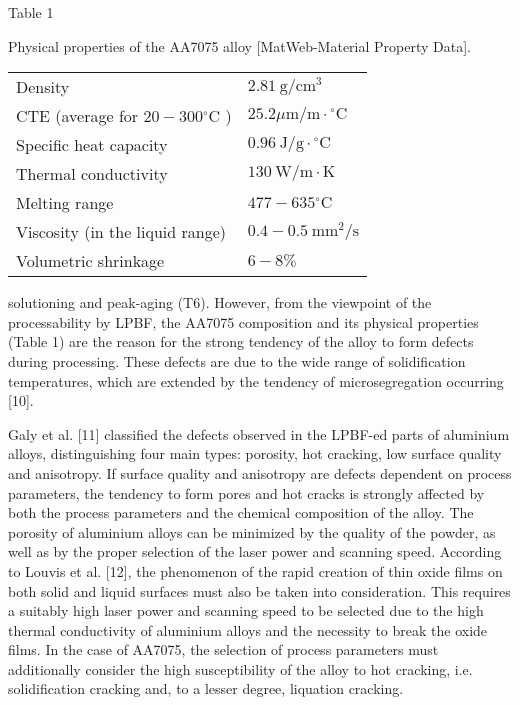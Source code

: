 \documentclass[10pt]{article}
\begin{document}
Table 1

Physical properties of the AA7075 alloy [MatWeb-Material Property Data].

\begin{center}
\begin{tabular}{ll}
\hline
Density & $2.81 \mathrm{~g} / \mathrm{cm}^{3}$ \\
CTE (average for $20-300{ }^{\circ} \mathrm{C}$ ) & $25.2 \mu \mathrm{m} / \mathrm{m} \cdot{ }^{\circ} \mathrm{C}$ \\
Specific heat capacity & $0.96 \mathrm{~J} / \mathrm{g} \cdot{ }^{\circ} \mathrm{C}$ \\
Thermal conductivity & $130 \mathrm{~W} / \mathrm{m} \cdot \mathrm{K}$ \\
Melting range & $477-635{ }^{\circ} \mathrm{C}$ \\
Viscosity (in the liquid range) & $0.4-0.5 \mathrm{~mm}^{2} / \mathrm{s}$ \\
Volumetric shrinkage & $6-8 \%$ \\
\hline
\end{tabular}
\end{center}

solutioning and peak-aging (T6). However, from the viewpoint of the processability by LPBF, the AA7075 composition and its physical properties (Table 1) are the reason for the strong tendency of the alloy to form defects during processing. These defects are due to the wide range of solidification temperatures, which are extended by the tendency of microsegregation occurring [10].

Galy et al. [11] classified the defects observed in the LPBF-ed parts of aluminium alloys, distinguishing four main types: porosity, hot cracking, low surface quality and anisotropy. If surface quality and anisotropy are defects dependent on process parameters, the tendency to form pores and hot cracks is strongly affected by both the process parameters and the chemical composition of the alloy. The porosity of aluminium alloys can be minimized by the quality of the powder, as well as by the proper selection of the laser power and scanning speed. According to Louvis et al. [12], the phenomenon of the rapid creation of thin oxide films on both solid and liquid surfaces must also be taken into consideration. This requires a suitably high laser power and scanning speed to be selected due to the high thermal conductivity of aluminium alloys and the necessity to break the oxide films. In the case of AA7075, the selection of process parameters must additionally consider the high susceptibility of the alloy to hot cracking, i.e. solidification cracking and, to a lesser degree, liquation cracking.
\end{document}
